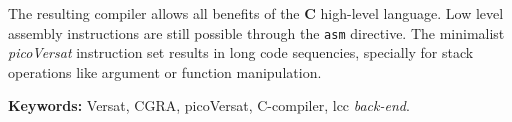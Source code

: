 The resulting compiler allows all benefits of the {\bf C} high-level language.
Low level assembly instructions are still possible through the {\tt asm} directive.
The minimalist {\it picoVersat} instruction set results in long code sequencies,
specially for stack operations like argument or function manipulation. %

\vfill

\textbf{\Large Keywords:} Versat, CGRA, picoVersat, C-compiler, lcc {\it back-end}.

\cleardoublepage

